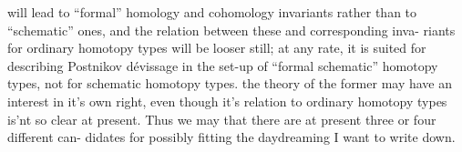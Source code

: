 will lead to ``formal'' homology and cohomology invariants rather than to
``schematic'' ones,  and the relation between these and corresponding inva-%
riants for ordinary homotopy types will be looser still;  at any rate,
it is suited for  describing Postnikov dévissage in the set-up
of ``formal schematic'' homotopy types, not for schematic homotopy types.
 the theory of the former may have an interest in it's own right,  even
though it's relation to ordinary homotopy types is'nt so clear at present.
Thus we may  that there are  at present  three or four different can-%
didates for possibly fitting the daydreaming I want to write down.  
